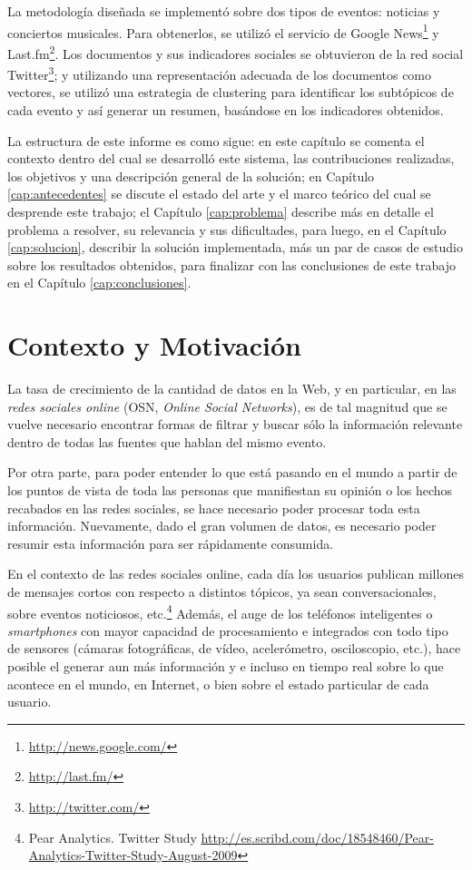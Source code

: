  La metodología diseñada se implementó sobre dos tipos de eventos:
  noticias y conciertos musicales. Para obtenerlos, se utilizó
  el servicio de Google News\footnote{\href{http://news.google.com/}{http://news.google.com/} } y
  Last.fm\footnote{\href{http://last.fm/}{http://last.fm/} }. Los documentos y sus indicadores
  sociales se obtuvieron de la red social
  Twitter\footnote{\href{http://twitter.com/}{http://twitter.com/} }; y utilizando una representación
  adecuada de los documentos como vectores, se utilizó una estrategia
  de clustering para identificar los subtópicos de cada evento y así
  generar un resumen, basándose en los indicadores obtenidos.

  La estructura de este informe es como sigue: en este capítulo se
  comenta el contexto dentro del cual se desarrolló este sistema, las
  contribuciones realizadas, los objetivos y una descripción general
  de la solución; en Capítulo \ref{cap:antecedentes} se discute el estado del
  arte y el marco teórico del cual se desprende este trabajo; el
  Capítulo \ref{cap:problema} describe más en detalle el problema a resolver, su
  relevancia y sus dificultades, para luego, en el
  Capítulo \ref{cap:solucion}, describir la solución implementada, más
  un par de casos de estudio sobre los resultados obtenidos, para
  finalizar con las conclusiones de este trabajo en el Capítulo
  \ref{cap:conclusiones}.

\section{Contexto y Motivación}
\label{sec-1.1}


   La tasa de crecimiento de la cantidad de datos en la Web, y en
   particular, en las \emph{redes sociales online} (OSN, \emph{Online Social Networks}),
   es de tal magnitud que se vuelve necesario encontrar formas de
   filtrar y buscar sólo la información relevante dentro de todas las
   fuentes que hablan del mismo evento.

   Por otra parte, para poder entender lo que está pasando en el
   mundo a partir de los puntos de vista de toda las personas que
   manifiestan su opinión o los hechos recabados en las redes
   sociales, se hace necesario poder procesar toda esta
   información. Nuevamente, dado el gran volumen de datos, es
   necesario poder resumir esta información para ser rápidamente
   consumida.

   En el contexto de las redes sociales online, cada día los usuarios
   publican  millones de mensajes cortos con respecto a distintos
   tópicos, ya sean conversacionales, sobre eventos noticiosos,
   etc.\footnote{Pear Analytics. Twitter Study \href{http://es.scribd.com/doc/18548460/Pear-Analytics-Twitter-Study-August-2009}{http://es.scribd.com/doc/18548460/Pear-Analytics-Twitter-Study-August-2009} }
   Además, el auge de los teléfonos inteligentes o \emph{smartphones} con mayor
   capacidad de procesamiento e integrados con todo tipo de sensores
   (cámaras fotográficas, de vídeo, acelerómetro, osciloscopio, etc.),
   hace posible el generar aun más información y
   e incluso en tiempo real sobre lo que acontece en el mundo, en
   Internet, o bien sobre el estado particular de cada usuario.

